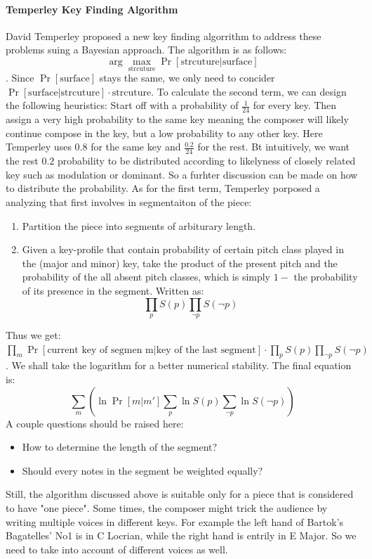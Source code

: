 \paragraph*{Temperley Key Finding Algorithm}
David Temperley proposed a new key finding algorrithm to address these problems suing a 
Bayesian approach. The algorithm is as follows:
\[\arg \max_{\text{strcuture}}\Pr[\text{strcuture|surface}]\]. 
Since $\Pr[\text{surface}]$ stays the same, we only need to concider
$\Pr[\text{surface|strcuture}]\cdot\text{strcuture}$. To calculate 
the second term, we can design the following heuristics:
Start off with a probability of $\frac{1}{24}$ for every key. Then assign a 
very high probability to the same key meaning the composer will likely continue
compose in the key, but a low probability to any other key. Here Temperley uses
$0.8$ for the same key and $\frac{0.2}{24}$ for the rest. Bt intuitively, we want the rest
$0.2$ probability to be distributed according to likelyness of closely related key 
such as modulation or dominant. So a furhter discussion can be 
made on how to distribute the probability. As for the first term, Temperley porposed
a analyzing that first involves in segmentaiton of the piece:
\begin{enumerate}
    \item Partition the piece into segments of arbiturary length.
    \item Given a key-profile that contain probability of certain pitch class 
    played in the (major and minor) key, take the product of the present pitch 
    and the probability of the all absent pitch classes, which is 
    simply $1-$ the probability of its presence in the segment. Written as:
    \[\prod_p S(p)\prod_{\neg p}S(\neg p) \]
\end{enumerate}
Thus we get:
$\prod_m \Pr[\text{current key of segmen m}|\text{key of the last segment}]
\cdot\prod_p S(p)\prod_{\neg p}S(\neg p)$. We shall 
take the logarithm for a better numerical stability. The final equation is:
\[\sum_m (\ln\Pr[m|m']\sum_p\ln S(p)\sum_{\neg p}\ln S(\neg p))\]
A couple questions should be raised here:
\begin{itemize}
    \item How to determine the length of the segment?
    \item Should every notes in the segment be weighted equally?
\end{itemize}
Still, the algorithm discussed above is suitable only for a piece that is 
considered to have "one piece". Some times, the composer might trick the 
audience by writing multiple voices in different keys. For example
the left hand of Bartok's Bagatelles' No1 is in C Locrian, while the right hand is 
entrily in E Major. So we need to take into account of different voices as well. 


